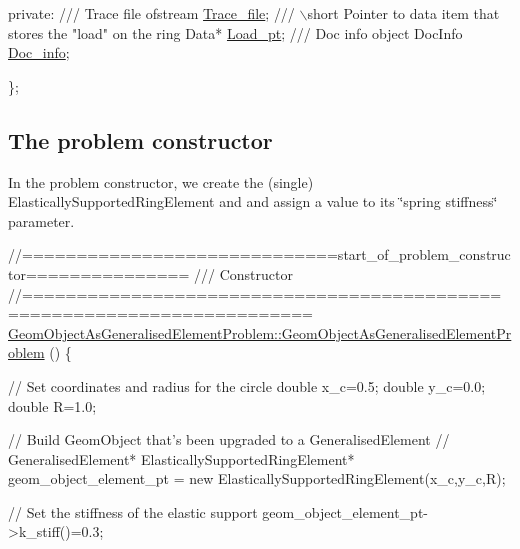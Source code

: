 \begin{DoxyCodeInclude}
\textcolor{keyword}{private}:
\textcolor{comment}{}
\textcolor{comment}{ /// Trace file}
\textcolor{comment}{} ofstream \hyperlink{classGeomObjectAsGeneralisedElementProblem_ad6261e556a52596ba8904ee902ea6d70}{Trace\_file};
\textcolor{comment}{}
\textcolor{comment}{ /// \(\backslash\)short Pointer to data item that stores the "load" on the ring}
\textcolor{comment}{} Data* \hyperlink{classGeomObjectAsGeneralisedElementProblem_ac04469b2dbce010fff3f5b2cf5591bcd}{Load\_pt};
\textcolor{comment}{}
\textcolor{comment}{ /// Doc info object}
\textcolor{comment}{} DocInfo \hyperlink{classGeomObjectAsGeneralisedElementProblem_a89a7f5fa555839193166f802d6ff6be2}{Doc\_info};

\};

\end{DoxyCodeInclude}




\hypertarget{index_constructor}{}\subsection{The problem constructor}\label{index_constructor}
In the problem constructor, we create the (single) {\ttfamily Elastically\+Supported\+Ring\+Element} and and assign a value to its \char`\"{}spring stiffness\char`\"{} parameter. 
\begin{DoxyCodeInclude}
\textcolor{comment}{//=============================start\_of\_problem\_constructor===============}
\textcolor{comment}{/// Constructor}
\textcolor{comment}{}\textcolor{comment}{//========================================================================}
\hyperlink{classGeomObjectAsGeneralisedElementProblem_ad1f15fcb6c055c58d1f71b522f1f7bd6}{GeomObjectAsGeneralisedElementProblem::GeomObjectAsGeneralisedElementProblem}
      ()
\{ 
 
 \textcolor{comment}{// Set coordinates and radius for the circle}
 \textcolor{keywordtype}{double} x\_c=0.5;
 \textcolor{keywordtype}{double} y\_c=0.0;
 \textcolor{keywordtype}{double} R=1.0;

 \textcolor{comment}{// Build GeomObject that's been upgraded to a GeneralisedElement}
 \textcolor{comment}{// GeneralisedElement* }
 ElasticallySupportedRingElement* geom\_object\_element\_pt = 
  \textcolor{keyword}{new} ElasticallySupportedRingElement(x\_c,y\_c,R);

 \textcolor{comment}{// Set the stiffness of the elastic support}
 geom\_object\_element\_pt->k\_stiff()=0.3;

\end{DoxyCodeInclude}



